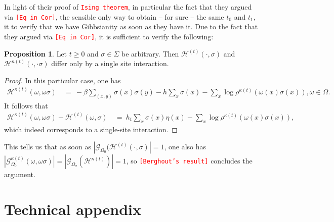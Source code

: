 \documentclass[12pt]{article}
\newcommand{\G}{\mathcal{G}}
\renewcommand{\H}{\mathcal{H}}
\newcommand{\pika}{\boldsymbol{\cdot}}
\newcommand{\1}{\mathbbm{1}}
\newcommand{\5}{\vspace{0.5cm}}
\theoremstyle{definition}
\newtheorem{prop}[thm]{Proposition}
\begin{document}
In light of their proof of \textcolor{red}{\textcolor{red}{\texttt{Ising theorem}}}, in particular the fact that they argued via \textcolor{red}{\texttt{[Eq in Cor]}}, the sensible only way to obtain -- for sure -- the same $t_0$ and $t_1$, it to verify that we have Gibbsianity as soon as they have it. Due to the fact that they argued via \textcolor{red}{\texttt{[Eq in Cor]}}, it is sufficient to verify the following:
\begin{prop} Let $t\geq 0$ and $\sigma\in\Sigma$ be arbitrary. Then $\H^{(t)}(\pika,\sigma)$ and $\H^{\kappa(t)}(\pika,\pika\sigma)$ differ only by a single site interaction.
\end{prop}
\begin{proof}
In this particular case, one has
\begin{align*}
\H^{\kappa(t)}(\omega,\omega\sigma) ~&=~ -\beta\sum_{(x,y)}\sigma(x)\sigma(y) - h\sum_{x}\sigma(x) -\sum_{x}\log\rho^{\kappa(t)}(\omega(x)\sigma(x)), \omega\in\Omega.
\end{align*}
It follows that
\begin{align*}
\H^{\kappa(t)}(\omega,\omega\sigma) - \H^{(t)}(\omega,\sigma) ~&=~ h_t\sum_{x}\sigma(x)\eta(x) - \sum_{x}\log\rho^{\kappa(t)}(\omega(x)\sigma(x)),
\end{align*}
which indeed corresponds to a single-site interaction.
\end{proof}

This tells us that as soon as $|\G_{\Omega_0}(\H^{(t)}(\pika,\sigma)|=1$, one also has $|\G_{\Omega_0}^{\kappa(t)}(\omega,\omega\sigma)|=|\G_{\Omega_\sigma}(\H^{\kappa(t)})|=1$, so \textcolor{red}{\texttt{[Berghout's result]}} concludes the argument.

\pagebreak



\appendix

\section{Technical appendix}

\end{document}
